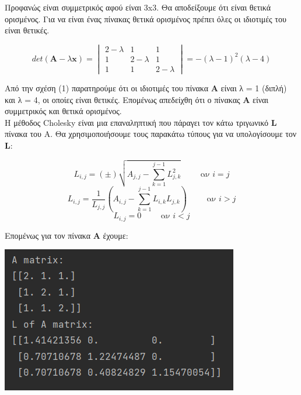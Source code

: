 \documentclass{article}
\begin{document}
Προφανώς είναι συμμετρικός αφού είναι 3x3. Θα αποδείξουμε ότι είναι θετικά ορισμένος. Για να είναι ένας πίνακας θετικά ορισμένος πρέπει όλες οι ιδιοτιμές του είναι θετικές.

\begin{center}
    \begin{equation}
        det(\textbf{A} - λ\textbf{x}) = \begin{vmatrix} 2-λ & 1 & 1\\ 1 & 2-λ & 1\\ 1 & 1 & 2-λ \end{vmatrix} = -(λ-1)^2(λ-4)
    \end{equation}
\end{center}

Από την σχέση (1) παρατηρούμε ότι οι ιδιοτιμές του πίνακα \textbf{Α} είναι λ = 1 (διπλή) και λ = 4, οι οποίες είναι θετικές. Επομένως απεδείχθη ότι ο πίνακας \textbf{Α} είναι συμμετρικός και θετικά ορισμένος. \\

Η μέθοδος Cholesky είναι μια επαναληπτική που πάραγει τον κάτω τριγωνικό \textbf{L} πίνακα του Α. Θα χρησιμοποιήσουμε τους παρακάτω τύπους για να υπολογίσουμε τον \textbf{L}:

\begin{center}
    \begin{equation*}
        L_{i,j} = (\pm) \sqrt{A_{j,j} - \sum_{k=1}^{j-1} L^2_{j,k}} \hspace{1cm} \text{αν \(i=j\)}
    \end{equation*}
    \begin{equation*}
        L_{i,j} = \frac{1}{L_{j,j}} (A_{i,j} - \sum_{k=1}^{j-1} L_{i,k}L_{j,k})   \hspace{1cm} \text{αν \(i>j\)}
    \end{equation*}
    \begin{equation*}
        L_{i,j} = 0 \hspace{1cm} \text{αν \(i<j\)}
    \end{equation*}
\end{center}

Επομένως για τον πίνακα \textbf{A} έχουμε: \\
\begin{center}\includegraphics[]{images/results_7.png}\end{center}
\end{document}
